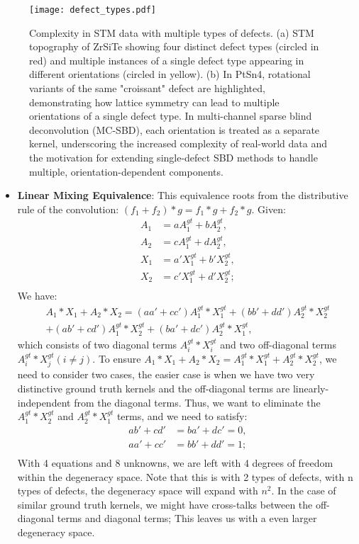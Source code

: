 \begin{figure}
	\texttt{[image: defect\_types.pdf]} 
	\centering
	\caption{Complexity in STM data with multiple types of defects. (a) STM topography of ZrSiTe showing four distinct defect types (circled in red) and multiple instances of a single defect type appearing in different orientations (circled in yellow). (b) In PtSn4, rotational variants of the same "croissant" defect are highlighted, demonstrating how lattice symmetry can lead to multiple orientations of a single defect type. In multi-channel sparse blind deconvolution (MC-SBD), each orientation is treated as a separate kernel, underscoring the increased complexity of real-world data and the motivation for extending single-defect SBD methods to handle multiple, orientation-dependent components.}
	\label{fig:ch6_defect}
\end{figure}

\begin{itemize}
	\item \textbf{Linear Mixing Equivalence}: This equivalence roots from the distributive rule of the convolution: $(f_1+f_2)*g = f_1*g + f_2*g$. Given: 
	\begin{align*}
		A_1 &= aA_1^{gt}+bA_2^{gt}, \\
		A_2 &= cA_1^{gt}+dA_2^{gt}, \\
		X_1 &= a'X_1^{gt}+b'X_2^{gt}, \\
		X_2 &= c'X_1^{gt}+d'X_2^{gt}; \\
	\end{align*}
	We have: 
	\begin{align*}
		A_1*X_1 +A_2*X_2= (aa'+cc') A_1^{gt}*X_1^{gt}+ (bb'+dd')A_2^{gt}*X_2^{gt} \\+ (ab'+cd') A_1^{gt}*X_2^{gt} +(ba'+dc') A_2^{gt}*X_1^{gt},
	\end{align*}
	which consists of two diagonal terms $A_i^{gt}*X_i^{gt}$ and two off-diagonal terms $A_i^{gt}*X_j^{gt} (i \neq j)$. To ensure $A_1*X_1 +A_2*X_2 = A_1^{gt}*X_1^{gt} + A_2^{gt}*X_2^{gt}$, we need to consider two cases, the easier case is when we have two very distinctive ground truth kernels and the off-diagonal terms are linearly-independent from the diagonal terms. Thus, we want to eliminate the $A_1^{gt}*X_2^{gt}$ and $A_2^{gt}*X_1^{gt}$ terms, and we need to satisfy:
	 \begin{align*}
	 	ab'+cd'&= ba' + dc' = 0, \\
	 	aa'+cc'&= bb' + dd' = 1; \\
	 \end{align*}
	 With 4 equations and 8 unknowns, we are left with 4 degrees of freedom within the degeneracy space. Note that this is with 2 types of defects, with n types of defects, the degeneracy space will expand with $n^2$. In the case of similar ground truth kernels, we might have cross-talks between the off-diagonal terms and diagonal terms; This leaves us with a even larger degeneracy space. 
\end{itemize}

